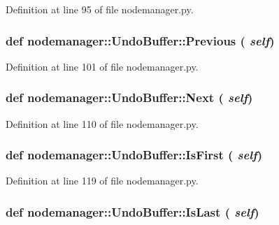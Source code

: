 Definition at line 95 of file nodemanager.py.\hypertarget{classnodemanager_1_1UndoBuffer_8c689bee39a62cf857525787f6def0a4}{
\subsubsection[Previous]{\setlength{\rightskip}{0pt plus 5cm}def nodemanager::Undo\-Buffer::Previous ( {\em self})}}
\label{classnodemanager_1_1UndoBuffer_8c689bee39a62cf857525787f6def0a4}




Definition at line 101 of file nodemanager.py.\hypertarget{classnodemanager_1_1UndoBuffer_a29ba64843a2d852b28cc01b411ce06f}{
\subsubsection[Next]{\setlength{\rightskip}{0pt plus 5cm}def nodemanager::Undo\-Buffer::Next ( {\em self})}}
\label{classnodemanager_1_1UndoBuffer_a29ba64843a2d852b28cc01b411ce06f}




Definition at line 110 of file nodemanager.py.\hypertarget{classnodemanager_1_1UndoBuffer_2ff748b5b8445e36cac96fd5726dc80e}{
\subsubsection[IsFirst]{\setlength{\rightskip}{0pt plus 5cm}def nodemanager::Undo\-Buffer::Is\-First ( {\em self})}}
\label{classnodemanager_1_1UndoBuffer_2ff748b5b8445e36cac96fd5726dc80e}




Definition at line 119 of file nodemanager.py.\hypertarget{classnodemanager_1_1UndoBuffer_87ef542c80367efcb4f5d8c97dabc4de}{
\subsubsection[IsLast]{\setlength{\rightskip}{0pt plus 5cm}def nodemanager::Undo\-Buffer::Is\-Last ( {\em self})}}
\label{classnodemanager_1_1UndoBuffer_87ef542c80367efcb4f5d8c97dabc4de}




